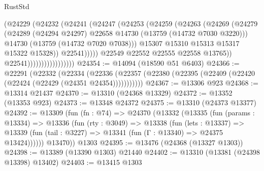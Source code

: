 \begin{lexlean}{RustStd}
\begin{coremodule}
                                        (@24229
                                          (@24232
                                            (@24241
                                              (@24247
                                                (@24253
                                                  (@24259
                                                    (@24263
                                                      (@24269
                                                        (@24279
                                                          (@24289
                                                            (@24294 @24297)
                                                            @22658
                                                            @14730
                                                            (@13759 (@14732 @7030 @3220)))
                                                          @14730
                                                          (@13759 (@14732 @7020 @7038)))
                                                        @15307
                                                        @15310
                                                        @15313
                                                        @15317
                                                        @15322
                                                        @15328))
                                                    @22541)))))
                                          @22549
                                          @22552
                                          @22555
                                          @22558
                                          @13765))
                                      @22541)))))))))))))))))
@24354 := @14094 (@18590 @51 @6403)
@24366 := @22291
    (@22332
      (@22334
        (@22336 (@22357 (@22380 (@22395 (@22409 (@22420 (@22424 (@22429 (@24351 @24354)))))))))))
@24367 := @13306 @923
@24368 := @13314 @21437
@24370 := @13310 (@24368 @13329)
@24372 := @13352 (@13353 @923)
@24373 := @13348 @24372
@24375 := @13310 (@24373 @13377)
@24392 := @13309
    (fun (fn : @74) =>
    @24370
      (@13332
        (@13335
          (fun (params : @13334) =>
          @13336
            (fun (rty : @3049) =>
            @13338
              (fun (lets : @13337) =>
              @13339 (fun (tail : @3227) => @13341 (fun (Γ : @13340) => @24375 @13424))))))
        @13470))
    @1303
@24395 := @13476 (@24368 (@13327 @1303))
@24398 := @13389 (@13390 @1303) @21440
@24402 := @13310 (@13381 (@24398 @13398) @13402)
@24403 := @13415 @1303

\end{coremodule}
\end{lexlean}
